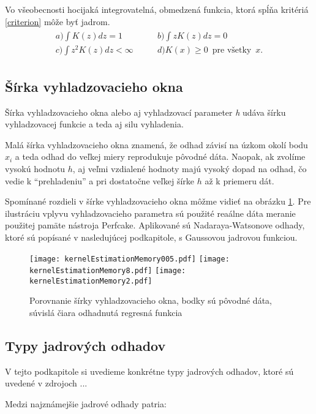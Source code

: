 Vo všeobecnosti hocijaká integrovatelná, obmedzená funkcia, ktorá spĺňa kritériá \ref{criterion} môže byť jadrom.
\begin{align}\label{criterion}
\begin{split}
a) \int K(z)dz = 1 \qquad & b) \int zK(z)dz = 0 \\ 
c) \int z^2K(z)dz < \infty \qquad & d) K(x) \geq 0 \enspace \textrm{pre všetky} \enspace x.
\end{split}
\end{align} 

\subsection{Šírka vyhladzovacieho okna}

Šírka vyhladzovacieho okna alebo aj vyhladzovací parameter \textit{h} udáva šírku vyhladzovacej funkcie a teda aj silu vyhladenia. 

Malá šírka vyhladzovacieho okna znamená, že odhad závisí na úzkom okolí bodu $x_i$ a teda odhad do veľkej miery reprodukuje pôvodné dáta. Naopak, ak zvolíme vysokú hodnotu $h$, aj veľmi vzdialené hodnoty majú vysoký dopad na odhad, čo vedie k ``prehladeniu'' a pri dostatočne veľkej šírke $h$ až k priemeru dát.

 Spomínané rozdieli v šírke vyhladzovacieho okna môžme vidieť na obrázku \ref{porovnanieSirky}. Pre ilustráciu vplyvu vyhladzovacieho parametra sú použité reaálne dáta meranie použitej pamäte nástroja Perfcake. Aplikované sú Nadaraya-Watsonove odhady, ktoré sú popísané v nasledujúcej podkapitole, s Gaussovou jadrovou funkciou. 
 
 \begin{figure}[!ht]
  \texttt{[image: kernelEstimationMemory005.pdf]}
  \texttt{[image: kernelEstimationMemory8.pdf]}
  \centering
  \texttt{[image: kernelEstimationMemory2.pdf]}
  \caption{Porovnanie šírky vyhladzovacieho okna, bodky sú pôvodné dáta, súvislá čiara odhadnutá regresná funkcia}\label{porovnanieSirky}
\end{figure}
 
\subsection{Typy jadrových odhadov}
V tejto podkapitole si uvedieme konkrétne typy jadrových odhadov, ktoré sú uvedené v zdrojoch ...

Medzi najznámejšie jadrové odhady patria:

